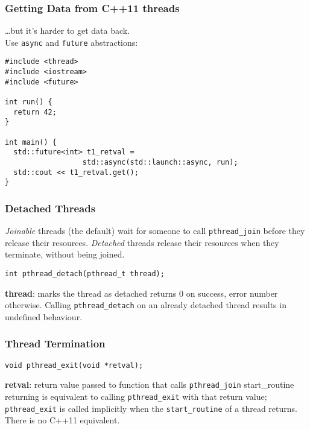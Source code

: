 \documentclass[aspectratio=43]{beamer}
\newenvironment{changemargin}[1]{%
  \begin{list}{}{%
    \setlength{\topsep}{0pt}%
    \setlength{\leftmargin}{#1}%
    \setlength{\rightmargin}{1em}
    \setlength{\listparindent}{\parindent}%
    \setlength{\itemindent}{\parindent}%
    \setlength{\parsep}{\parskip}%
  }%
  \item[]}{\end{list}}
\begin{document}
\begin{frame}[fragile]
  \frametitle{Getting Data from C++11 threads}
  \begin{changemargin}{1.5cm}
    \ldots but it's harder to get data back.\\
    Use {\tt async} and {\tt future} abstractions:
    \begin{lstlisting}
#include <thread>
#include <iostream>
#include <future>

int run() {
  return 42;
}

int main() {
  std::future<int> t1_retval =
                  std::async(std::launch::async, run);
  std::cout << t1_retval.get();
}
\end{lstlisting}
\end{changemargin}
  
\end{frame}

\begin{frame}[fragile]
  \frametitle{Detached Threads}

\begin{changemargin}{1.5cm}
  {\it Joinable} threads (the default) wait for someone to call
  {\tt pthread\_join} before they release their resources.
  \vfill
  {\it Detached} threads release their resources when they terminate, without
  being joined.
  \vfill
  \begin{lstlisting}
int pthread_detach(pthread_t thread);
  \end{lstlisting}
  \vfill
  {\bf thread}: marks the thread as detached
  \vfill
  returns 0 on success, error number otherwise.
  \vfill
  Calling {\tt pthread\_detach} on an already detached thread results in undefined
  behaviour.
\end{changemargin}

\end{frame}

\begin{frame}[fragile]
  \frametitle{Thread Termination}

\begin{changemargin}{1.5cm}
  \begin{lstlisting}
void pthread_exit(void *retval);
  \end{lstlisting}
  \vfill
  {\bf retval}: return value passed to function that calls {\tt pthread\_join}
  \vfill
  start\_routine returning is equivalent to calling {\tt pthread\_exit} with
  that return value;
  \vfill
  {\tt pthread\_exit} is called implicitly when the {\tt start\_routine} of a
  thread returns.
  \vfill
  There is no C++11 equivalent.
\end{changemargin}

\end{frame}
\end{document}
